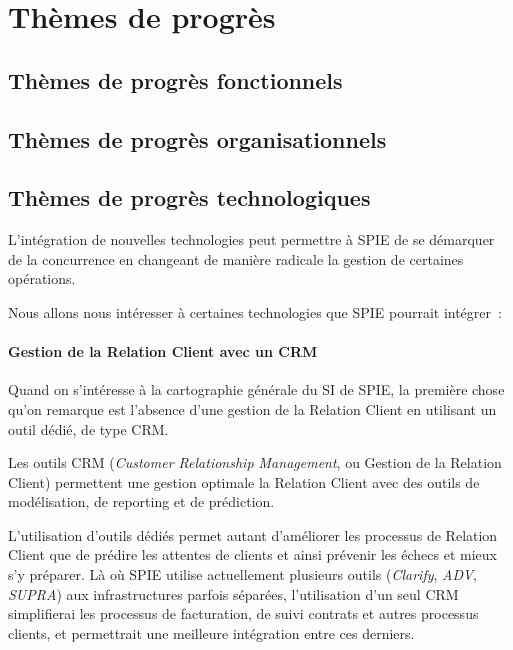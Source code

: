 \chapter{Thèmes de progrès}

\section{Thèmes de progrès fonctionnels}

\section{Thèmes de progrès organisationnels}

\section{Thèmes de progrès technologiques}

    L'intégration de nouvelles technologies peut permettre à SPIE de se démarquer de la concurrence en changeant de manière radicale la gestion de certaines opérations.

    Nous allons nous intéresser à certaines technologies que SPIE pourrait intégrer~:

        \subsubsection{Gestion de la Relation Client avec un CRM}

            Quand on s'intéresse à la cartographie générale du SI de SPIE, la première chose qu'on remarque est l'absence d'une gestion de la Relation Client en utilisant un outil dédié, de type CRM.

            Les outils CRM (\textit{Customer Relationship Management}, ou Gestion de la Relation Client) permettent une gestion optimale la Relation Client avec des outils de modélisation, de reporting et de prédiction.

            L'utilisation d'outils dédiés permet autant d'améliorer les processus de Relation Client que de prédire les attentes de clients et ainsi prévenir les échecs et mieux s'y préparer. Là où SPIE utilise actuellement plusieurs outils (\textit{Clarify}, \textit{ADV}, \textit{SUPRA}) aux infrastructures parfois séparées, l'utilisation d'un seul CRM simplifierai les processus de facturation, de suivi contrats et autres processus clients, et permettrait une meilleure intégration entre ces derniers.

